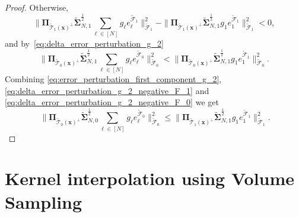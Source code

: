 \documentclass[twoside,11pt]{book}
\numberwithin{theorem}{chapter}
\numberwithin{definition}{chapter}
\numberwithin{proposition}{chapter}
\numberwithin{corollary}{chapter}
\numberwithin{example}{chapter}
\numberwithin{lemma}{chapter}
\begin{document}
\begin{proof}
Otherwise,  
\begin{equation}\label{eq:delta_error_perturbation_g_2_negative_F_1}
 \|\bm{\Pi}_{\tilde{\mathcal{T}}_{1}(\bm{x})^{\perp}} \tilde{\bm{\Sigma}}_{N,1}^{\frac{1}{2}} \sum\limits_{\ell \in [N]}g_{\ell} e_{\ell}^{\tilde{\mathcal{F}}_{1}}\|_{\tilde{\mathcal{F}}_{1}}^{2} - \|\bm{\Pi}_{\tilde{\mathcal{T}}_{1}(\bm{x})^{\perp}} \tilde{\bm{\Sigma}}_{N,1}^{\frac{1}{2}} g_{1} e_{1}^{\tilde{\mathcal{F}}_{1}}\|_{\tilde{\mathcal{F}}_{1}}^{2} < 0, 
\end{equation}
and by~\eqref{eq:delta_error_perturbation_g_2}
\begin{equation}\label{eq:delta_error_perturbation_g_2_negative_F_0}
\|\bm{\Pi}_{\tilde{\mathcal{T}}_{0}(\bm{x})^{\perp}} \tilde{\bm{\Sigma}}_{N,1}^{\frac{1}{2}} \sum\limits_{\ell \in [N]}g_{\ell} e_{\ell}^{\tilde{\mathcal{F}}_{0}}\|_{\tilde{\mathcal{F}}_{0}}^{2} < \|\bm{\Pi}_{\tilde{\mathcal{T}}_{0}(\bm{x})^{\perp}} \tilde{\bm{\Sigma}}_{N,1}^{\frac{1}{2}} g_{1} e_{1}^{\tilde{\mathcal{F}}_{1}}\|_{\tilde{\mathcal{F}}_{0}}^{2}.
\end{equation}
Combining \eqref{eq:error_perturbation_first_component_g_2}, \eqref{eq:delta_error_perturbation_g_2_negative_F_1} and \eqref{eq:delta_error_perturbation_g_2_negative_F_0} 
we get
\begin{equation}
\:\|\bm{\Pi}_{\tilde{\mathcal{T}}_{0}(\bm{x})^{\perp}} \tilde{\bm{\Sigma}}_{N,0}^{\frac{1}{2}} \sum\limits_{\ell \in [N]}g_{\ell} e_{\ell}^{\tilde{\mathcal{F}}_{0}}\|_{\tilde{\mathcal{F}}_{0}}^{2} \leq \|\bm{\Pi}_{\tilde{\mathcal{T}}_{1}(\bm{x})^{\perp}} \tilde{\bm{\Sigma}}_{N,1}^{\frac{1}{2}} g_{1} e_{1}^{\tilde{\mathcal{F}}_{1}}\|_{\tilde{\mathcal{F}}_{1}}^{2}.
\end{equation}
\end{proof}


\clearpage

\chapter{Kernel interpolation using Volume Sampling}
\end{document}
